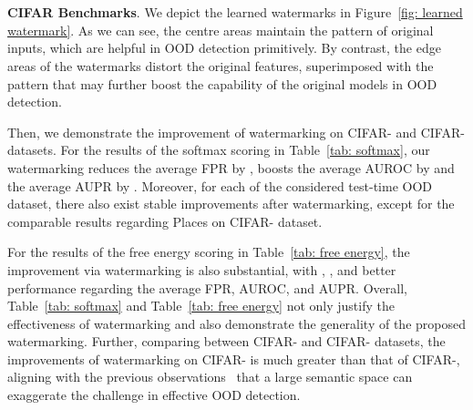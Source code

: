 \documentclass{article}
\begin{document}
\begin{figure*}[t]
\centering  
{} 
~~~~~~~~

~~~~~~~~

\caption{The learned watermarks (left) and the example images with (middle) and without (right) the watermarks. All the pictures are clamped between  and  for the purpose of illustration.} \label{fig: learned watermark}

\end{figure*}


\textbf{CIFAR Benchmarks}. 
We depict the learned watermarks in Figure~\ref{fig: learned watermark}. As we can see, the centre areas maintain the pattern of original inputs, which are helpful in OOD detection primitively. By contrast, the edge areas of the watermarks distort the original features, superimposed with the pattern that may further boost the capability of the original models in OOD detection. 

Then, we demonstrate the improvement of watermarking on CIFAR- and CIFAR- datasets. For the results of the softmax scoring in Table~\ref{tab: softmax}, our watermarking reduces the average FPR by , boosts the average AUROC by  and the average AUPR by . Moreover, for each of the considered test-time OOD dataset, there also exist stable improvements after watermarking, except for the comparable results regarding Places on CIFAR- dataset. 

For the results of the free energy scoring in Table~\ref{tab: free energy}, the improvement via watermarking is also substantial, with , , and  better performance regarding the average FPR, AUROC, and AUPR. Overall, Table~\ref{tab: softmax} and Table~\ref{tab: free energy} not only justify the effectiveness of watermarking and also demonstrate the generality of the proposed watermarking. Further, comparing between CIFAR- and CIFAR- datasets, the improvements of watermarking on CIFAR- is much greater than that of CIFAR-, aligning with the previous observations~\cite{HuangL21} that a large semantic space can exaggerate the challenge in effective OOD detection. 
\end{document}
